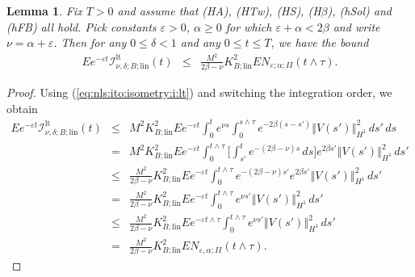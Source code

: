 \documentclass[10pt]{articleHJ}
\newcommand{\e}{\ensuremath{\varepsilon}}
\renewcommand{\a}{\ensuremath{\alpha}}
\newcommand{\norm}[1]{\left\Vert#1\right\Vert}		%
\newcommand{\sref}[1]{(\ref{#1})}                       %
\newtheorem{lem}[thm]{Lemma}
\numberwithin{equation}{section}
\begin{document}


\begin{lem}
\label{lem:nls:b:lin:lt:i}
Fix $T > 0$ and assume that (HA), (HTw), (HS),
(H$\beta$),
(hSol) and (hFB) all hold.
Pick constants $\e > 0$,
$\alpha \ge 0$
for which $\e + \a  < 2\beta$
and write $\nu = \alpha + \e$.
Then for
any $0 \le  \delta < 1$
and any $0 \le t \le T$,
we have the bound
\begin{equation}
\begin{array}{lcl}
E e^{-\e t} \mathcal{I}^{\mathrm{lt}}_{\nu,\delta;B;\mathrm{lin}}(t)
 & \le &    \frac{M^2}{2 \beta - \nu} K_{B;\mathrm{lin}}^2
  E  N_{\e;\alpha;II}(t \wedge \tau).
\end{array}
\end{equation}
\end{lem}
\begin{proof}
Using \sref{eq:nls:ito:isometry:i:lt}
and switching the integration order,
we obtain
\begin{equation}
\begin{array}{lcl}
E  e^{-\e t}\mathcal{I}^{\mathrm{lt}}_{\nu,\delta;B;\mathrm{lin}}(t)
  &\leq  &
  M^2 K_{B;\mathrm{lin}}^2 E  e^{-\e t}  \int_0^{t}
  e^{ \nu s }
    \int_0^{s \wedge \tau}  e^{-2 \beta(s-s')}\norm{V(s')}_{H^1}^2 \, ds' \, ds
\\[0.2cm]
& = &
  M^2 K_{B;\mathrm{lin}}^2 E  e^{-\e t }  \int_0^{t \wedge \tau}
    \Big[\int_{s'}^{t }
      e^{  -(2 \beta -\nu )s } \, d s
   \Big]
      e^{2 \beta s'}\norm{V(s')}_{H^1}^2  \, ds'
\\[0.2cm]
& \le &
  \frac{M^2}{2 \beta - \nu} K_{B;\mathrm{lin}}^2
  E  e^{ - \e t }  \int_0^{t\wedge \tau}
      e^{-(2 \beta - \nu)s'}
       e^{2 \beta s'}\norm{V(s')}_{H^1}^2  \, ds'
\\[0.2cm]
& = &
  \frac{M^2}{2 \beta - \nu} K_{B;\mathrm{lin}}^2
  E  e^{-\e t }  \int_0^{t\wedge \tau}
   e^{ \nu s'}  \norm{V(s')}_{H^1}^2  \, ds'
\\[0.2cm]
& \le &
  \frac{M^2}{2 \beta - \nu} K_{B;\mathrm{lin}}^2
    E  e^{-\e t\wedge \tau }  \int_0^{t\wedge \tau}
   e^{ \nu s'}  \norm{V(s')}_{H^1}^2  \, ds'
\\[0.2cm]
& = &
   \frac{M^2}{2 \beta - \nu} K_{B;\mathrm{lin}}^2
  E  N_{\e,\alpha;II}(t \wedge \tau).
\end{array}
\end{equation}
\end{proof}
\end{document}
